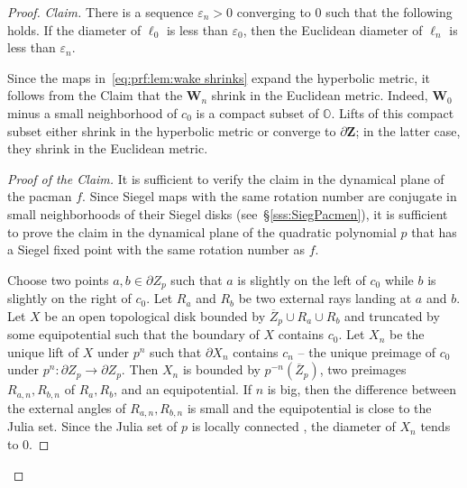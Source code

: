 \documentclass{amsart}
\newcommand{\1}{{\mathbb 1 }}
\newcommand{\bO}{{\mathbb{O}}}
\newcommand{\bZ}{{\mathbf Z}}
\newcommand{\bW}{{\mathbf W}}
\theoremstyle{remark}
\numberwithin{equation}{section}
\theoremstyle{definition}
\theoremstyle{nonumberbreak}
\begin{document}
\begin{proof}
\emph{Claim.} There is a sequence $\varepsilon_n>0$ converging to $0$ such that the following holds. If the diameter of $\ell_0$ is less than $\varepsilon_0$, then the Euclidean diameter of $\ell_n$ is less than $\varepsilon_n$.

Since the maps in~\eqref{eq:prf:lem:wake shrinks} expand the hyperbolic metric, it follows from the Claim that the $\bW_n$ shrink in the Euclidean metric. Indeed, $\bW_0$ minus a small neighborhood of $c_0$ is a compact subset of $\bO$. Lifts of this compact subset either shrink in the hyperbolic metric or converge to $\partial \bZ$; in the latter case, they shrink in the Euclidean metric.
\begin{proof}[Proof of the Claim]
It is sufficient to verify the claim in the dynamical plane of the pacman $f$. Since Siegel maps with the same rotation number are conjugate in small neighborhoods of  their Siegel disks (see~\S\ref{sss:SiegPacmen}), it is sufficient to prove the claim in the dynamical plane of the quadratic polynomial $p$ that has a Siegel fixed point with the same rotation number as $f$.

Choose two points $a,b\in \partial Z_p$ such that $a$ is slightly on the left of $c_0$ while $b$ is slightly on the right of $c_0$. Let $R_a$ and $R_b$ be two external rays landing at $a$ and $b$. Let $X$ be an open topological disk bounded by $\overline Z_p\cup R_a\cup R_b$ and truncated by some equipotential such that the boundary of $X$ contains $c_0$. Let $X_n$ be the unique lift of $X$ under $p^n$ such that $\partial X_n$ contains $c_n$ -- the unique preimage of $c_0$ under $p^n\colon \partial Z_p\to \partial Z_p$. Then $X_n$ is bounded by $p^{-n}(\overline Z_p) $, two preimages $R_{a,n},R_{b,n}$ of $R_a,R_b$, and an equipotential. If $n$ is big, then the difference between the external angles of $R_{a,n},R_{b,n}$ is small and the equipotential is close to the Julia set. Since the Julia set of $p$ is locally connected \cite{Pe}, the diameter of $X_n$ tends to $0$. 
\end{proof}
\end{proof}
\end{document}
